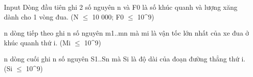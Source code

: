 Input
Dòng đầu tiên ghi 2 số nguyên n và F0 là số khúc quanh và lượng xăng dành cho 1 vòng đua. (N $\le$ 10 000; F0 $\le$ 10^9)

n dòng tiếp theo ghi n số nguyên m1..mn mà mi là vận tốc lớn nhất của xe đua ở khúc quanh thứ i. (Mi $\le$ 10^9)

n dòng cuối ghi n số nguyên S1..Sn mà Si là độ dài của đoạn đường thẳng thứ i. (Si $\le$ 10^9)